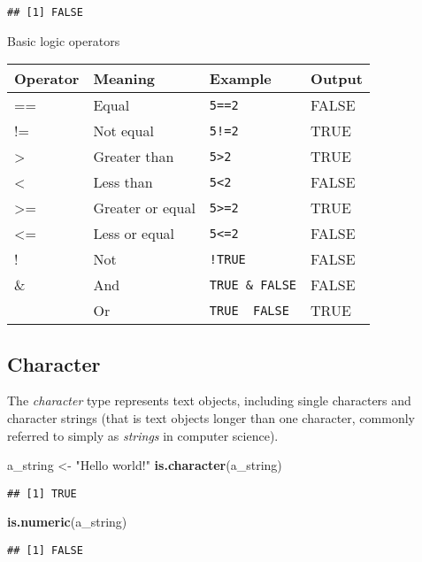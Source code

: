 \documentclass[
]{book}
\newenvironment{Shaded}{\begin{snugshade}}{\end{snugshade}}
\newcommand{\KeywordTok}[1]{\textcolor[rgb]{0.13,0.29,0.53}{\textbf{#1}}}
\newcommand{\NormalTok}[1]{#1}
\newcommand{\StringTok}[1]{\textcolor[rgb]{0.31,0.60,0.02}{#1}}
\begin{document}
\begin{verbatim}
## [1] FALSE
\end{verbatim}

Basic logic operators

\begin{longtable}[]{@{}llll@{}}
\toprule
Operator & Meaning & Example & Output\tabularnewline
\midrule
\endhead
== & Equal & \texttt{5==2} & FALSE\tabularnewline
!= & Not equal & \texttt{5!=2} & TRUE\tabularnewline
\textgreater{} & Greater than & \texttt{5\textgreater{}2} & TRUE\tabularnewline
\textless{} & Less than & \texttt{5\textless{}2} & FALSE\tabularnewline
\textgreater= & Greater or equal & \texttt{5\textgreater{}=2} & TRUE\tabularnewline
\textless= & Less or equal & \texttt{5\textless{}=2} & FALSE\tabularnewline
! & Not & \texttt{!TRUE} & FALSE\tabularnewline
\& & And & \texttt{TRUE\ \&\ FALSE} & FALSE\tabularnewline
\textbar{} & Or & \texttt{TRUE\ \textbar{}\ FALSE} & TRUE\tabularnewline
\bottomrule
\end{longtable}

\hypertarget{character}{%
\subsection{Character}\label{character}}

The \emph{character} type represents text objects, including single characters and character strings (that is text objects longer than one character, commonly referred to simply as \emph{strings} in computer science).

\begin{Shaded}
\begin{Highlighting}[]
\NormalTok{a_string <-}\StringTok{ "Hello world!"}
\KeywordTok{is.character}\NormalTok{(a_string)}
\end{Highlighting}
\end{Shaded}

\begin{verbatim}
## [1] TRUE
\end{verbatim}

\begin{Shaded}
\begin{Highlighting}[]
\KeywordTok{is.numeric}\NormalTok{(a_string)}
\end{Highlighting}
\end{Shaded}

\begin{verbatim}
## [1] FALSE
\end{verbatim}
\end{document}
